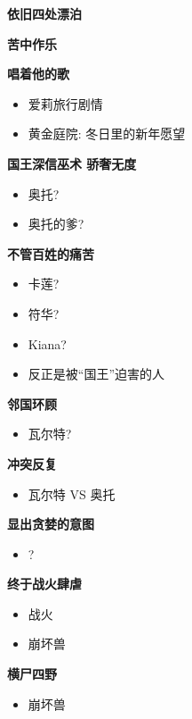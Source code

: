 \documentclass[a4paper]{article}
\begin{document}
\textbf{依旧四处漂泊}

\textbf{苦中作乐}

\textbf{唱着他的歌}

\begin{itemize}
    \item 爱莉旅行剧情
    \item 黄金庭院: 冬日里的新年愿望
\end{itemize}

\textbf{国王深信巫术 骄奢无度}

\begin{itemize}
    \item 奥托?
    \item 奥托的爹?
\end{itemize}

\textbf{不管百姓的痛苦}

\begin{itemize}
    \item 卡莲?
    \item 符华?
    \item Kiana?
    \item 反正是被“国王”迫害的人
\end{itemize}

\textbf{邻国环顾}

\begin{itemize}
    \item 瓦尔特?
\end{itemize}

\textbf{冲突反复}

\begin{itemize}
    \item 瓦尔特 VS 奥托
\end{itemize}

\textbf{显出贪婪的意图}

\begin{itemize}
    \item ?
\end{itemize}

\textbf{终于战火肆虐}

\begin{itemize}
    \item 战火
    \item 崩坏兽
\end{itemize}

\textbf{横尸四野}

\begin{itemize}
    \item 崩坏兽
\end{itemize}
\end{document}
